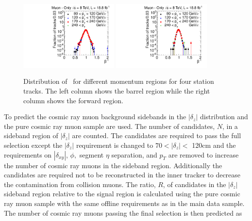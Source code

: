 \begin{figure}
\begin{center}
\includegraphics[clip=true, trim=0.0cm 0cm 3.0cm 0cm,width=0.44\textwidth]{figures/muonly/Control_Data8TeV_Pt_TOFSpectrum_Binned_2}
\includegraphics[clip=true, trim=0.0cm 0cm 3.0cm 0cm,width=0.44\textwidth]{figures/muonly/Control_Data8TeV_Pt_TOFSpectrum_Binned_5}
\caption[Distribution of \invbeta\
  for different momentum regions for four station tracks in the \muononly\ analysis.]
{Distribution of \invbeta\
for different momentum regions for four station tracks.
The  left column shows the barrel region while the right column
shows the forward region.}
\label{fig:MuOnlyControl4}
\end{center}
\end{figure}

To predict the cosmic ray muon background sidebands in the $|\delta_z|$ distribution and the pure cosmic ray muon sample are used. The number of candidates, $N$, 
in a sideband region of $|\delta_z|$ are counted. The candidates are required to pass the full selection except the $|\delta_z|$ requirement 
is changed to $70 < |\delta_z| <$ 120cm and
the requirements on $|\delta_{xy}|$, $\phi,$ segment $\eta$ separation, and $p_T$ are removed to increase the number of cosmic ray muons in the sideband region. 
Additionally the candidates
are required not to be reconstructed in the inner tracker to decrease the contamination from collision muons. The ratio, $R$, of candidates in the $|\delta_z|$ sideband region 
relative to the signal region is calculated using the pure cosmic ray muon sample with the same offline requirements as in the main data sample. The number of cosmic ray muons
passing the final selection is then predicted as 

